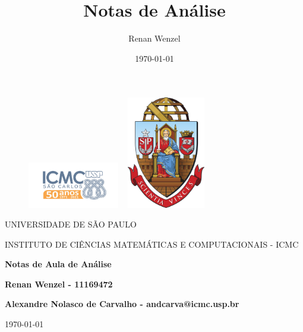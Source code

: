\documentclass{article}
\title{Notas de An\'alise}
\author{Renan Wenzel}
\date{\today}
\begin{document}
\begin{figure}[ht]
	\includegraphics[width=4cm]{icmc.png}
	\hspace{7cm}
	\includegraphics[height=4.9cm,width=4cm]{brasao_usp_cor.jpg}
	\endminipage
\end{figure}

\begin{center}
	\vspace{1cm}
	\LARGE
	UNIVERSIDADE DE S\~AO PAULO

	\vspace{1.3cm}
	\LARGE
	INSTITUTO DE CI\^ENCIAS MATEM\'ATICAS E COMPUTACIONAIS - ICMC

	\vspace{1.7cm}
	\Large
	\textbf{Notas de Aula de An\'alise}

	\vspace{1.3cm}
	\large
	\textbf{Renan Wenzel - 11169472}

	\vspace{1.3cm}
	\large
	\textbf{Alexandre Nolasco de Carvalho - andcarva@icmc.usp.br}

	\vspace{1.3cm}
	\today
\end{center}

\newpage

\tableofcontents

\newpage


\newpage


\newpage


\newpage


\newpage


\newpage
\end{document}

